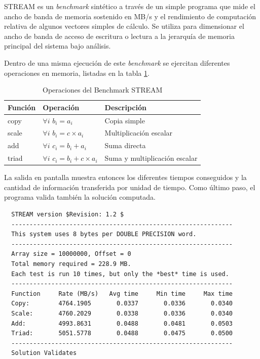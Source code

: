 \documentclass[a4paper]{report}
\begin{document}
STREAM \cite{stream} es un {\it benchmark} sint\'etico a trav\'es de un simple
programa que mide el ancho de banda de memoria sostenido en MB/s y el
rendimiento de computaci\'on relativa de algunos vectores simples de c\'alculo.
Se utiliza para dimensionar el ancho de banda de acceso de escritura o lectura
a la jerarqu\'ia de memoria principal del sistema bajo an\'alisis.

\bigskip

Dentro de una misma ejecuci\'on de este {\it benchmark} se ejercitan diferentes
operaciones en memoria, listadas en la tabla \ref{table:stream}.

\begin{table}[H]
\caption{Operaciones del Benchmark STREAM}
  \begin{center}
    \begin{tabular}{|l|l|l|}\hline
      {\bf Funci\'on} & {\bf Operaci\'on} & {\bf Descripci\'on} \\ \hline
      copy & $ \forall i $ $ b_{i} = a_{i} $ & Copia simple \\ \hline
      scale & $ \forall i $ $ b_{i} = c \times a_{i} $ & Multiplicaci\'on escalar \\ \hline
      add & $ \forall i $ $ c_{i} = b_{i} + a_{i} $ & Suma directa \\ \hline
      triad & $ \forall i $ $ c_{i} = b_{i} + c \times a_{i} $ & Suma y multiplicaci\'on escalar \\ \hline
    \end{tabular} 
   \end{center}
 \label{table:stream}
\end{table}

La salida en pantalla muestra entonces los diferentes tiempos conseguidos y la cantidad de informaci\'on transferida por unidad de tiempo.
Como \'ultimo paso, el programa valida tambi\'en la soluci\'on computada.

{\small
\begin{verbatim}
  STREAM version $Revision: 1.2 $
  -------------------------------------------------------------
  This system uses 8 bytes per DOUBLE PRECISION word.
  -------------------------------------------------------------
  Array size = 10000000, Offset = 0
  Total memory required = 228.9 MB.
  Each test is run 10 times, but only the *best* time is used.
  -------------------------------------------------------------
  Function     Rate (MB/s)   Avg time     Min time     Max time
  Copy:        4764.1905       0.0337       0.0336       0.0340
  Scale:       4760.2029       0.0338       0.0336       0.0340
  Add:         4993.8631       0.0488       0.0481       0.0503
  Triad:       5051.5778       0.0488       0.0475       0.0500
  -------------------------------------------------------------
  Solution Validates
\end{verbatim}
}
\end{document}
